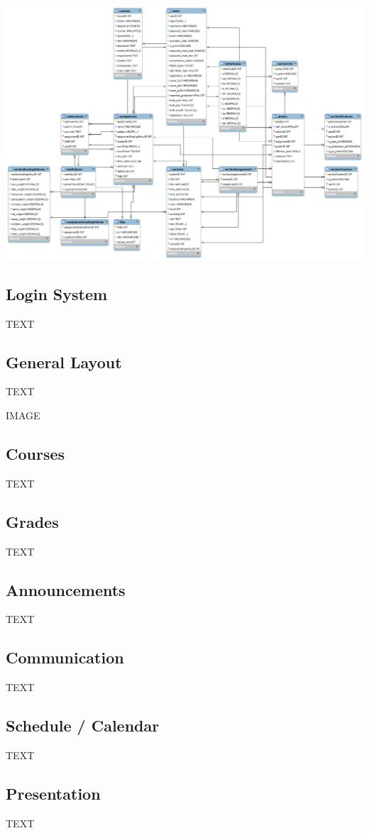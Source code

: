 \documentclass{article}
\begin{document}
\includegraphics[width=6.5 in]{db}

\subsection{Login System}

TEXT

\subsection{General Layout}

TEXT

IMAGE

\subsection{Courses}

TEXT

\subsection{Grades}

TEXT

\subsection{Announcements}

TEXT

\subsection{Communication}

TEXT

\subsection{Schedule / Calendar}

TEXT

\subsection{Presentation}

TEXT

{} 
\end{document}
